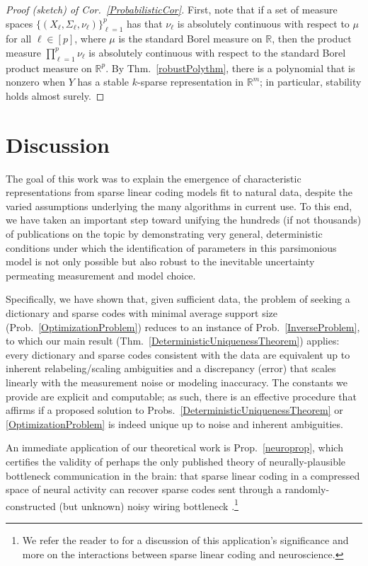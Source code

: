 \documentclass[9pt,twocolumn]{pnas-new}
\begin{document}
\begin{proof}[Proof (sketch) of Cor.~\ref{ProbabilisticCor}]
First, note that if a set of measure spaces $\{(X_{\ell}, \Sigma_{\ell}, \nu_{\ell})\}_{\ell=1}^p$ has that $\nu_{\ell}$ is absolutely continuous with respect to $\mu$ for all $\ell \in [p]$, where $\mu$ is the standard Borel measure on $\mathbb{R}$, then the product measure $\prod_{\ell=1}^p \nu_{\ell}$ is absolutely continuous with respect to the standard Borel product measure on $\mathbb{R}^p$. %
By Thm.~\ref{robustPolythm}, there is a polynomial that is nonzero when $Y$ has a stable $k$-sparse representation in $\mathbb{R}^m$; in particular, stability holds almost surely.
\end{proof}

\section{Discussion}\label{Discussion}

The goal of this work was to explain the emergence of characteristic representations from sparse linear coding models fit to natural data, despite the varied assumptions underlying the many algorithms in current use. To this end, we have taken an important step toward unifying the hundreds (if not thousands) of publications on the topic by demonstrating very general, deterministic conditions under which the identification of parameters in this parsimonious model is not only possible but also robust to the inevitable uncertainty permeating measurement and model choice.

Specifically, we have shown that, given sufficient data, the problem of seeking a dictionary and sparse codes with minimal average support size (Prob.~\ref{OptimizationProblem}) reduces to an instance of Prob.~\ref{InverseProblem}, to which our main result (Thm.~\ref{DeterministicUniquenessTheorem}) applies: every dictionary and sparse codes consistent with the data are equivalent up to inherent relabeling/scaling ambiguities and a discrepancy (error) that scales linearly with the measurement noise or modeling inaccuracy. The constants we provide are explicit and computable; as such, there is an effective procedure that affirms if a proposed solution to Probs.~\ref{DeterministicUniquenessTheorem} or \ref{OptimizationProblem} is indeed unique up to noise and inherent ambiguities.

An immediate application of our theoretical work is Prop.~\ref{neuroprop}, which certifies the validity of perhaps the only published theory of neurally-plausible bottleneck communication in the brain: that sparse linear coding in a compressed space of neural activity can recover sparse codes sent through a randomly-constructed (but unknown) noisy wiring bottleneck \cite{Isely10}.\footnote{We refer the reader to \cite{ganguli2012compressed} for a discussion of this application's significance and more on the interactions between sparse linear coding and neuroscience.}
\end{document}
